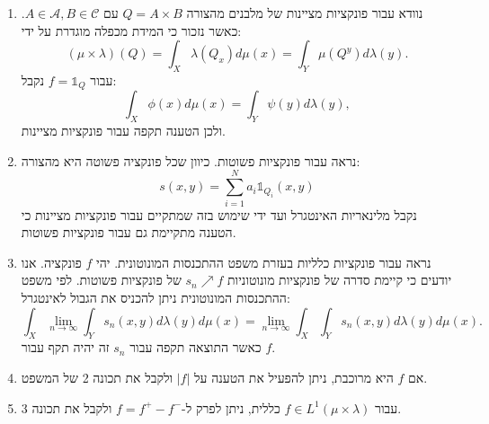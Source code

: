 \documentclass{tstextbook}
\begin{document}
\begin{enumerate}
  \item נוודא עבור פונקציות מציינות של מלבנים מהצורה \(Q=A\times B\) עם \(A \in \mathcal{A},B \in \mathcal{C}\). כאשר נזכור כי המידת מכפלה מוגדרת על ידי: 
$$(\mu\times\lambda)(Q)=\int_{X}\lambda(Q_{x})d\mu(x)=\int_{Y}\mu(Q^{y})d\lambda(y).$$
עבור \(f=\mathbb{1}_{Q}\) נקבל:
$$\int_{X}\phi(x)d\mu(x)=\int_{Y}\psi(y)d\lambda(y),$$
ולכן הטענה תקפה עבור פונקציות מציינות.


  \item נראה עבור פונקציות פשוטות. כיוון שכל פונקציה פשוטה היא מהצורה: 
$$s(x,y)=\sum_{i=1}^{N}a_{i}\mathbb{1} _{Q_{i}}(x,y)$$
נקבל מלינאריות האינטגרל ועד ידי שימוש בזה שמתקיים עבור פונקציות מציינות כי הטענה מתקיימת גם עבור פונקציות פשוטות.


  \item נראה עבור פונקציות כלליות בעזרת משפט ההתכנסות המונוטונית. יהי \(f\) פונקציה. אנו יודעים כי קיימת סדרה של פונקציות מונוטוניות \(s_{n}\nearrow f\) של פונקציות פשוטות. לפי משפט ההתכנסות המונוטונית ניתן להכניס את הגבול לאינטגרל: 
$$\int_{X}\operatorname*{lim}_{n\to\infty}\int_{Y}s_{n}(x,y)d\lambda(y)d\mu(x)=\operatorname*{lim}_{n\to\infty}\int_{X}\int_{Y}s_{n}(x,y)d\lambda(y)d\mu(x).$$
כאשר התוצאה תקפה עבור \(s_{n}\) זה יהיה תקף עבור \(f\).


  \item אם \(f\) היא מרוכבת, ניתן להפעיל את הטענה על \(|f|\) ולקבל את תכונה 2 של המשפט. 


  \item עבור \(f \in L^{1}\left( \mu \times \lambda \right)\) כללית, ניתן לפרק ל-\(f=f^{+}-f^{-}\) ולקבל את תכונה 3. 



\end{enumerate}
\end{document}

